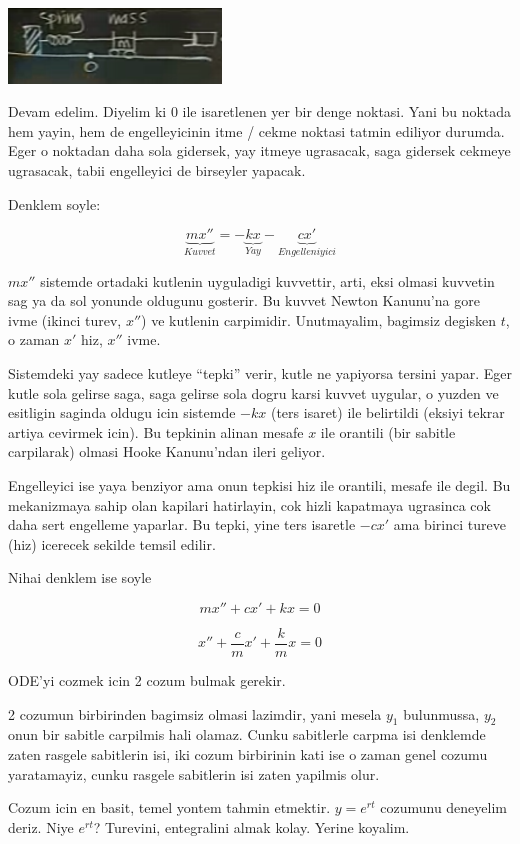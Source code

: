\documentclass[12pt,fleqn]{article}
\begin{document}
\includegraphics[height=2cm]{9_2.png}

Devam edelim. Diyelim ki 0 ile isaretlenen yer bir denge noktasi. Yani bu
noktada hem yayin, hem de engelleyicinin itme / cekme noktasi tatmin
ediliyor durumda. Eger o noktadan daha sola gidersek, yay itmeye ugrasacak,
saga gidersek cekmeye ugrasacak, tabii engelleyici de birseyler yapacak. 

Denklem soyle: 

\[ \underbrace{mx''}_{Kuvvet} =
- \underbrace{kx}_{Yay} 
- \underbrace{cx'}_{Engelleniyici}
\]

$mx''$ sistemde ortadaki kutlenin uyguladigi kuvvettir, arti, eksi olmasi
kuvvetin sag ya da sol yonunde oldugunu gosterir. Bu kuvvet Newton Kanunu'na
gore ivme (ikinci turev, $x''$) ve kutlenin carpimidir. Unutmayalim,
bagimsiz degisken $t$, o zaman $x'$ hiz, $x''$ ivme.

Sistemdeki yay sadece kutleye ``tepki'' verir, kutle ne yapiyorsa tersini
yapar. Eger kutle sola gelirse saga, saga gelirse sola dogru karsi kuvvet
uygular, o yuzden ve esitligin saginda oldugu icin sistemde $-kx$ (ters
isaret) ile belirtildi (eksiyi tekrar artiya cevirmek icin). Bu tepkinin
alinan mesafe $x$ ile orantili (bir sabitle carpilarak) olmasi Hooke
Kanunu'ndan ileri geliyor.

Engelleyici ise yaya benziyor ama onun tepkisi hiz ile orantili, mesafe ile
degil. Bu mekanizmaya sahip olan kapilari hatirlayin, cok hizli kapatmaya
ugrasinca cok daha sert engelleme yaparlar. Bu tepki, yine ters isaretle
$-cx'$ ama birinci tureve (hiz) icerecek sekilde temsil edilir.

Nihai denklem ise soyle

\[ mx'' + cx' + kx = 0 \]

\[ x'' + \frac{c}{m}x' + \frac{k}{m}x = 0 \]

ODE'yi cozmek icin 2 cozum bulmak gerekir. 

2 cozumun birbirinden bagimsiz olmasi lazimdir, yani mesela $y_1$
bulunmussa, $y_2$ onun bir sabitle carpilmis hali olamaz. Cunku sabitlerle
carpma isi denklemde zaten rasgele sabitlerin isi, iki cozum birbirinin
kati ise o zaman genel cozumu yaratamayiz, cunku rasgele sabitlerin isi
zaten yapilmis olur.

Cozum icin en basit, temel yontem tahmin etmektir. $y = e^{rt}$ cozumunu
deneyelim deriz. Niye $e^{rt}$? Turevini, entegralini almak kolay. Yerine
koyalim. 
\end{document}
